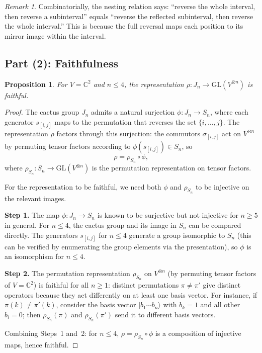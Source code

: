 \documentclass[11pt]{article}
\newtheorem{proposition}[theorem]{Proposition}
\theoremstyle{remark}
\newtheorem{remark}[theorem]{Remark}
\newcommand{\CC}{\mathbb{C}}
\newcommand{\ket}[1]{|#1\rangle}
\begin{document}
\begin{remark}
Combinatorially, the nesting relation says: ``reverse the whole interval,
then reverse a subinterval'' equals ``reverse the reflected subinterval,
then reverse the whole interval.'' This is because the full reversal maps
each position to its mirror image within the interval.
\end{remark}

\subsection{Part (2): Faithfulness}

\begin{proposition}\label{prop:faithful}
For $V = \CC^2$ and $n \leq 4$, the representation
$\rho\colon J_n \to \mathrm{GL}(V^{\otimes n})$ is faithful.
\end{proposition}

\begin{proof}
The cactus group $J_n$ admits a natural surjection $\phi\colon J_n \to S_n$,
where each generator $s_{[i,j]}$ maps to the permutation that reverses the
set $\{i, \ldots, j\}$. The representation $\rho$ factors through this
surjection: the commutors $\sigma_{[i,j]}$ act on $V^{\otimes n}$ by
permuting tensor factors according to $\phi(s_{[i,j]}) \in S_n$, so
\[
  \rho = \rho_{S_n} \circ \phi,
\]
where $\rho_{S_n}\colon S_n \to \mathrm{GL}(V^{\otimes n})$ is the
permutation representation on tensor factors.

For the representation to be faithful, we need both $\phi$ and $\rho_{S_n}$
to be injective on the relevant images.

\textbf{Step 1.} The map $\phi\colon J_n \to S_n$ is known to be surjective
but not injective for $n \geq 5$ in general. For $n \leq 4$, the cactus
group and its image in $S_n$ can be compared directly. The generators
$s_{[i,j]}$ for $n \leq 4$ generate a group isomorphic to $S_n$
(this can be verified by enumerating the group elements via the
presentation), so $\phi$ is an isomorphism for $n \leq 4$.

\textbf{Step 2.} The permutation representation $\rho_{S_n}$ on
$V^{\otimes n}$ (by permuting tensor factors of $V = \CC^2$) is faithful
for all $n \geq 1$: distinct permutations $\pi \neq \pi'$ give distinct
operators because they act differently on at least one basis vector.
For instance, if $\pi(k) \neq \pi'(k)$, consider the basis vector
$\ket{b_1 \cdots b_n}$ with $b_k = 1$ and all other $b_i = 0$; then
$\rho_{S_n}(\pi)$ and $\rho_{S_n}(\pi')$ send it to different basis vectors.

Combining Steps~1 and~2: for $n \leq 4$, $\rho = \rho_{S_n} \circ \phi$
is a composition of injective maps, hence faithful.
\end{proof}
\end{document}

